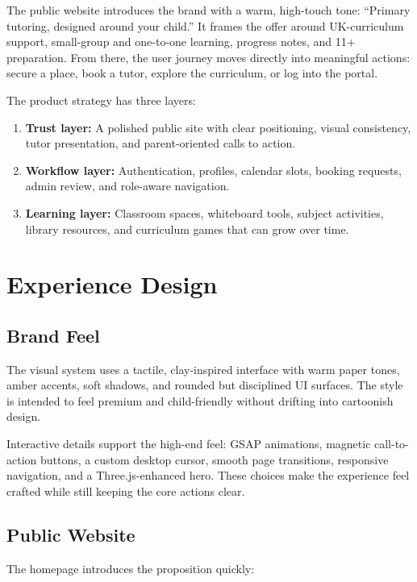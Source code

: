 \documentclass[11pt,a4paper]{article}
\begin{document}
The public website introduces the brand with a warm, high-touch tone: ``Primary tutoring, designed around your child.'' It frames the offer around UK-curriculum support, small-group and one-to-one learning, progress notes, and 11+ preparation. From there, the user journey moves directly into meaningful actions: secure a place, book a tutor, explore the curriculum, or log into the portal.

The product strategy has three layers:

\begin{enumerate}
    \item \textbf{Trust layer:} A polished public site with clear positioning, visual consistency, tutor presentation, and parent-oriented calls to action.
    \item \textbf{Workflow layer:} Authentication, profiles, calendar slots, booking requests, admin review, and role-aware navigation.
    \item \textbf{Learning layer:} Classroom spaces, whiteboard tools, subject activities, library resources, and curriculum games that can grow over time.
\end{enumerate}

\section{Experience Design}

\subsection{Brand Feel}

The visual system uses a tactile, clay-inspired interface with warm paper tones, amber accents, soft shadows, and rounded but disciplined UI surfaces. The style is intended to feel premium and child-friendly without drifting into cartoonish design.

Interactive details support the high-end feel: GSAP animations, magnetic call-to-action buttons, a custom desktop cursor, smooth page transitions, responsive navigation, and a Three.js-enhanced hero. These choices make the experience feel crafted while still keeping the core actions clear.

\subsection{Public Website}

The homepage introduces the proposition quickly:
\end{document}
